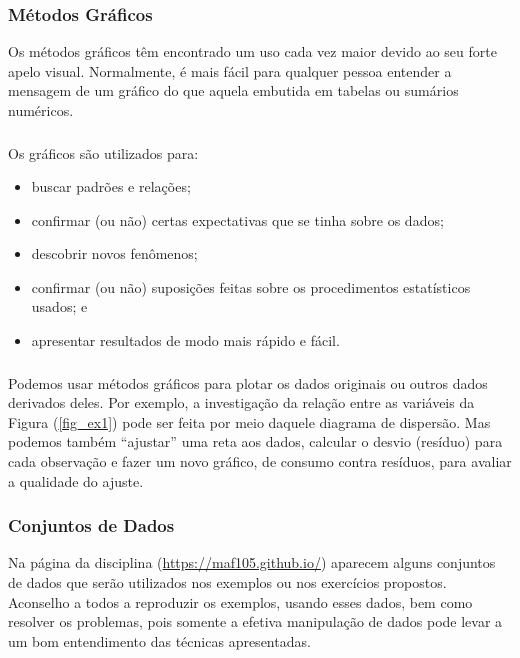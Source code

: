 \documentclass[14pt,aspectratio=1610]{beamer}
\begin{document}
\begin{frame}{}
\frametitle{Métodos Gráficos}
\begin{block}{}
\justifying
Os métodos gráficos têm encontrado um uso cada vez maior devido ao seu forte apelo visual. Normalmente, é mais fácil para qualquer pessoa entender a mensagem 
de um gráfico do que aquela embutida em tabelas ou sumários numéricos.
\end{block}
\end{frame}

\begin{frame}{}
\frametitle{}
\begin{block}{}
\justifying
Os gráficos são utilizados para:
\begin{itemize}
\item buscar padrões e relações;\pause
\item confirmar (ou não) certas expectativas que se tinha sobre os dados;\pause
\item descobrir novos fenômenos;\pause
\item confirmar (ou não) suposições feitas sobre os procedimentos estatísticos usados; e\pause
\item apresentar resultados de modo mais rápido e fácil.
\end{itemize}
\end{block}
\end{frame}

\begin{frame}{}
\frametitle{}
\begin{block}{}
\justifying
Podemos usar métodos gráficos para plotar os dados originais ou outros dados derivados
deles. Por exemplo, a investigação da relação entre as variáveis da Figura (\ref{fig_ex1}) pode ser feita por meio daquele diagrama de dispersão. Mas podemos também “ajustar” uma reta aos dados, calcular o desvio (resíduo) para cada observação e fazer um novo gráfico, de consumo contra resíduos, para avaliar a qualidade do ajuste.
\end{block}
\end{frame}

\begin{frame}{}
\frametitle{Conjuntos de Dados}
\begin{block}{}
\justifying
Na página da disciplina (\url{https://maf105.github.io/}) aparecem alguns conjuntos de dados que serão utilizados nos exemplos ou nos exercícios propostos. Aconselho a todos a reproduzir os exemplos, usando esses dados, bem como resolver os problemas, pois somente a efetiva manipulação de dados pode levar a um bom entendimento das técnicas apresentadas.
\end{block}
\end{frame}
\end{document}
